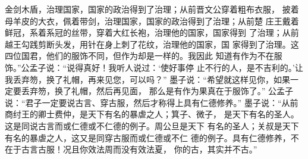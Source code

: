 \documentclass[12pt,UTF8]{ctexbook}
\begin{document}
金剑木盾，治理国家，国家的政治得到了治理；从前晋文公穿着粗布衣服， 
披着母羊皮的大衣，佩着带剑，治理国家，国家的政治得到了治理；从前楚 
庄王戴着鲜冠，系着系冠的丝带，穿着大红长袍，治理他的国家，国家得到 
了治理；从前越王勾践剪断头发，用针在身上刺了花纹，治理他的国家，国 
家得到了治理。这四位国君，他们的服饰不同，但作为却是一样的。我因此 
知道有作为不在服饰。”公孟子说：“说得真好！我听人说过：‘使好事停 
止不行的人，是不吉利的。’让我丢弃笏，换了礼帽，再来见您，可以吗？” 
墨子说：“希望就这样见你，如果一定要丢弃笏，换了礼帽，然后再见面， 
那么是有作为果真在于服饰了。” 
公孟子说：“君子一定要说古言、穿古服，然后才称得上具有仁德修养。” 
墨子说：“从前商纣王的卿士费仲，是天下有名的暴虐之人；箕子、微子， 
是天下有名的圣人。这是同说古言而或仁德或不仁德的例子。周公旦是天下 
有名的圣人；关叔是天下有名的暴虐之人，这又是同穿古服而或仁德或不仁 
德的例子。具有仁德修养，不在于古言古服！况且你效法周而没有效法夏， 
你的古，其实并不古。” 
\end{document}
